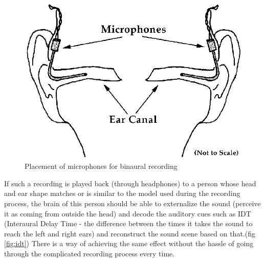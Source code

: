 \documentclass[a4paper,12pt,oneside]{article}
\begin{document}
\begin{center}
\begin{figure}[H]
    \centering
    \includegraphics[scale=0.3]{binrec.jpg}
    \caption{Placement of microphones for binaural recording}
    \label{fig:binrec}
\end{figure}
\end{center}

If such a recording is played back (through headphones) to a person whose head and ear shape matches or is similar to the model used during the recording process, the brain of this person should be able to externalize the sound (perceive it as coming from outside the head) and decode the auditory cues such as IDT (Interaural Delay Time - the difference between the times it takes the sound to reach the left and right ears) and reconstruct the sound scene based on that.(fig \ref{fig:idt}) There is a way of achieving the same effect without the hassle of going through the complicated recording process every time.\\
\end{document}
